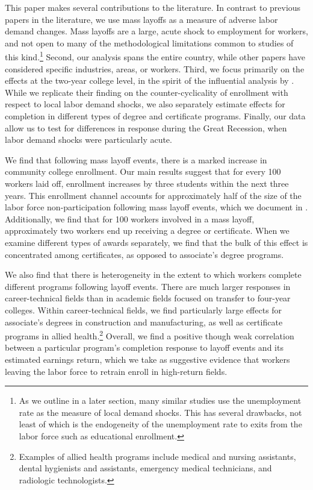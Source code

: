 This paper makes several contributions to the literature. In contrast to previous papers in the literature, we use mass layoffs as a  measure of adverse labor demand changes. Mass layoffs are  a large, acute shock to employment for workers, and not open to many of the methodological limitations common to studies of this kind.\footnote{As we outline in a later section, many similar studies use the unemployment rate as the measure of local demand shocks. This has several drawbacks, not least of which is the endogeneity of the unemployment rate to exits from the labor force such as educational enrollment.} Second, our analysis  spans the entire country, while other papers have considered  specific industries, areas, or workers. Third, we focus primarily on the effects at the two-year college level, in the spirit of the influential  analysis by \citet{BF1995}. While we replicate their finding on the counter-cyclicality of enrollment with respect to local labor demand shocks, we also separately estimate effects for completion in different types of degree and certificate programs. Finally, our data allow us to test for differences in response during the Great Recession, when labor  demand shocks were particularly acute. 

We find that following mass layoff events, there is a marked increase in community college enrollment. Our main results suggest that for every 100 workers laid off, enrollment increases by three students within the next three years. This enrollment channel accounts for approximately half of the size of the labor force non-participation following mass layoff events, which we document in \citet{FGS2015}. Additionally, we find that for 100 workers involved in a mass layoff, approximately two workers end up receiving a degree or certificate. When we examine different types of awards separately, we find that the bulk of this effect is concentrated among certificates, as opposed to associate's degree programs. 

We also find that there is heterogeneity in the extent to which workers complete different programs following layoff events. There are much larger responses in career-technical fields than in academic fields focused on transfer to four-year colleges. Within career-technical fields, we find particularly large effects for associate's degrees in construction and manufacturing, as well as certificate programs in allied health.\footnote{Examples of allied health programs include medical and nursing assistants, dental hygienists and assistants, emergency medical technicians, and radiologic technologists.} Overall, we find a positive though weak correlation between a particular program's completion response to layoff events and its estimated earnings return, which we take as suggestive evidence that workers leaving the labor force to retrain enroll in high-return fields. 

